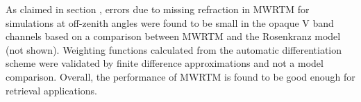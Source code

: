     As claimed in section , errors due to missing
    refraction in MWRTM for simulations at off-zenith angles were found to be
    small in the opaque V band channels based on a comparison between MWRTM and
    the Rosenkranz model (not shown). Weighting functions calculated from the
    automatic differentiation scheme were validated by finite difference
    approximations and not a model comparison. Overall, the performance of
    MWRTM is found to be good enough for retrieval applications.

\stopsubsection

\stopsection

